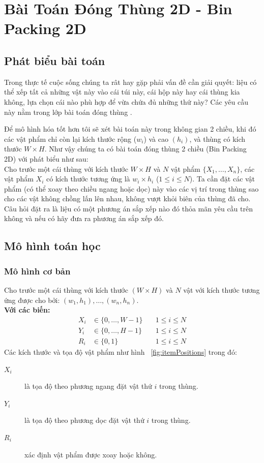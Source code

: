 \chapter{Bài Toán Đóng Thùng 2D - Bin Packing 2D}
\label{chap:binPacking}
\section{Phát biểu bài toán}
Trong thực tế cuộc sống chúng ta rât hay gặp phải vấn đề cần giải quyết: liệu có thể xếp tất cả những vật này vào cái túi này, cái hộp này hay cái thùng kia không, lựa chọn cái nào phù hợp để vừa chứa đủ những thứ này? Các yêu cầu này nằm trong lớp bài toán đóng thùng \cite{hopper2000twodimensional}.

Để mô hình hóa tốt hơn tôi sẽ xét bài toán này trong không gian 2 chiều, khi đó các vật phẩm chỉ còn lại kích thước rộng ($w_i$) và cao $(h_i)$, và thùng có kích thước $ W \times H $. Như vậy chúng ta có bài toán đóng thùng 2 chiều (Bin Packing 2D) với phát biểu như sau:\\
Cho trước một cái thùng với kích thước $W \times H$ và $N$ vật phẩm $\{X_1,\dots,X_n\}$, các vật phẩm $X_i$ có kích thước tương ứng là $w_i \times h_i$ ($1 \leq i \leq N$). Ta cần đặt các vật phẩm (có thể xoay theo chiều ngang hoặc dọc) này vào các vị trí trong thùng sao cho các vật không chồng lấn lên nhau, không vượt khỏi biên của thùng đã cho. Câu hỏi đặt ra là liệu có một phương án sắp xếp nào đó thỏa mãn yêu cầu trên không và nếu có hãy đưa ra phương án sắp xếp đó.

\section{Mô hình toán học}

\subsection*{Mô hình cơ bản}

Cho trước một cái thùng với kích thước $(W \times H)$ và $N$ vật với kích thước tương ứng được cho bởi: $(w_1, h_1),\dots,(w_n, h_n)$.\\
\textbf{Với các biến:}
\begin{align*}
	X_i &\in \{0,\dots,W-1\} \quad &1 \leq i \leq N \\
	Y_i &\in \{0,\dots,H-1\} \quad &1 \leq i \leq N \\
	R_i &\in \{0,1\} \quad &1 \leq i \leq N
\end{align*}
Các kích thước và tọa độ vật phẩm như hình ~\ref{fig:itemPositions} trong đó:
\begin{description}
	\item[$X_i$] là tọa độ theo phương ngang đặt vật thứ $i$ trong thùng.
	\item[$Y_i$] là tọa độ theo phương dọc đặt vật thứ $i$ trong thùng.
	\item[$R_i$] xác định vật phẩm được xoay hoặc không.
\end{description}

